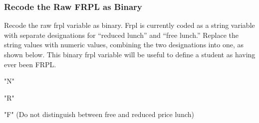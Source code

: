 \documentclass[12pt]{article}
\begin{document}
\subsubsection{Recode the Raw FRPL as Binary}
Recode the raw frpl variable as binary. Frpl is currently coded as a string variable with separate designations for ``reduced 
lunch'' and ``free lunch.''  Replace the string values with numeric values, combining the two designations into one, as shown 
below. This binary frpl variable will be useful to define a student as having ever been FRPL.

\begin{description}
\setlength{\parskip}{-6pt}
\item [0=] "N"
\item [1=] "R"
\item [1=] "F" (Do not distinguish between free and reduced price lunch)
\end{description}
\end{document}
